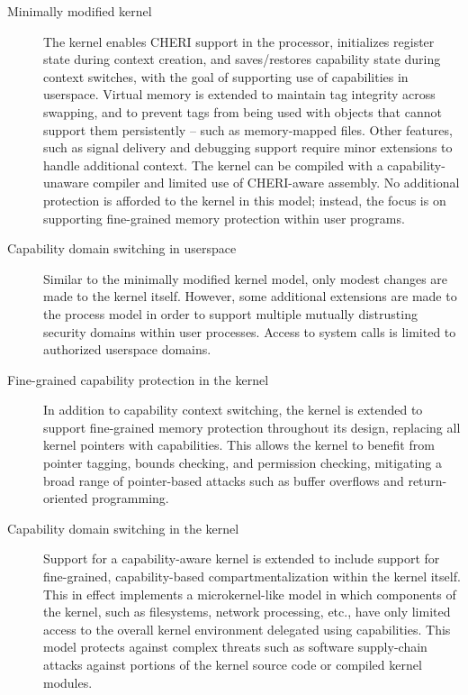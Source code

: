 \begin{description}
\item[Minimally modified kernel] The kernel enables CHERI support in the
  processor, initializes register state during context creation, and
  saves/restores capability state during context switches, with the goal of
  supporting use of capabilities in userspace.
  Virtual memory is extended to maintain tag 
integrity
  across swapping, and to prevent
  tags from being used with objects that cannot support them persistently
  -- such as memory-mapped files.
  Other features, such as signal delivery and debugging support require minor
  extensions to handle additional context.
  The kernel can be compiled with a capability-unaware compiler and limited
  use of CHERI-aware assembly.
  No additional protection is afforded to the kernel in this model; instead,
  the focus is on supporting fine-grained memory protection within user
  programs.

\item[Capability domain switching in userspace] Similar
  to the minimally modified kernel model, 
  only modest changes are made to the kernel itself.
  However, some additional extensions are made to the process model in order
  to support multiple mutually distrusting security domains within user
  processes.
  Access to system calls is limited to authorized userspace domains.

\item[Fine-grained capability protection in the kernel] In addition to
  capability context switching, the kernel is extended to support fine-grained
  memory protection throughout its design, replacing all kernel pointers with
  capabilities.
  This allows the kernel to benefit from pointer tagging, bounds checking, and
  permission checking, mitigating a broad range of pointer-based attacks such
  as buffer overflows and return-oriented programming.

\item[Capability domain switching in the kernel] Support for a
  capability-aware kernel is extended to include support for fine-grained,
  capability-based compartmentalization within the kernel itself.
  This in effect implements a microkernel-like model in which components of
the kernel, such as filesystems, network processing, etc., have only limited
  access to the overall kernel environment delegated using capabilities.
  This model protects against complex threats such as software supply-chain
  attacks against portions of the kernel source code or compiled kernel
  modules.


\end{description}
